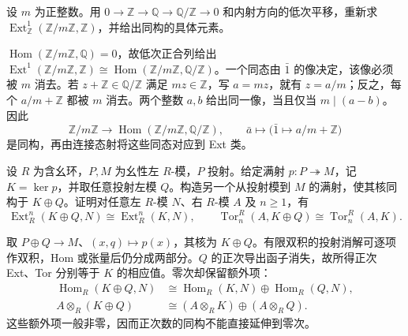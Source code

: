 \begin{exercise}\label{b4:ex:08-injective-shift-integers}
	设 \(m\) 为正整数。用 \(0\to\mathbb Z\to\mathbb Q\to\mathbb Q/\mathbb Z\to0\) 和内射方向的低次平移，重新求 \(\operatorname{Ext}_{\mathbb Z}^1(\mathbb Z/m\mathbb Z,\mathbb Z)\)，并给出同构的具体元素。
\end{exercise}
\begin{solution}
	\(\operatorname{Hom}(\mathbb Z/m\mathbb Z,\mathbb Q)=0\)，故低次正合列给出 \(\operatorname{Ext}^1(\mathbb Z/m\mathbb Z,\mathbb Z)\cong\operatorname{Hom}(\mathbb Z/m\mathbb Z,\mathbb Q/\mathbb Z)\)。一个同态由 \(\bar1\) 的像决定，该像必须被 \(m\) 消去。若 \(z+\mathbb Z\in\mathbb Q/\mathbb Z\) 满足 \(mz\in\mathbb Z\)，写 \(a=mz\)，就有 \(z=a/m\)；反之，每个 \(a/m+\mathbb Z\) 都被 \(m\) 消去。两个整数 \(a,b\) 给出同一像，当且仅当 \(m\mid(a-b)\)。因此
	\[
		\mathbb Z/m\mathbb Z\longrightarrow\operatorname{Hom}(\mathbb Z/m\mathbb Z,\mathbb Q/\mathbb Z), \qquad \bar a\longmapsto\bigl(\bar1\mapsto a/m+\mathbb Z\bigr)
	\]
	是同构，再由连接态射将这些同态对应到 Ext 类。
\end{solution}

\begin{exercise}\label{b4:ex:08-syzygy-change}
	设 \(R\) 为含幺环，\(P,M\) 为幺性左 \(R\)-模，\(P\) 投射。给定满射 \(p:P\twoheadrightarrow M\)，记 \(K=\ker p\)，并取任意投射左模 \(Q\)。构造另一个从投射模到 \(M\) 的满射，使其核同构于 \(K\oplus Q\)。证明对任意左 \(R\)-模 \(N\)、右 \(R\)-模 \(A\) 及 \(n\ge1\)，有
	\[
		\operatorname{Ext}_R^n(K\oplus Q,N)\cong\operatorname{Ext}_R^n(K,N),\qquad \operatorname{Tor}_n^R(A,K\oplus Q)\cong\operatorname{Tor}_n^R(A,K).
	\]
\end{exercise}
\begin{solution}
	取 \(P\oplus Q\to M\)、\((x,q)\mapsto p(x)\)，其核为 \(K\oplus Q\)。有限双积的投射消解可逐项作双积，Hom 或张量后仍分成两部分。\(Q\) 的正次导出函子消失，故所得正次 Ext、Tor 分别等于 \(K\) 的相应值。零次却保留额外项：
	\[
		\begin{aligned}
			\operatorname{Hom}_R(K\oplus Q,N) &\cong\operatorname{Hom}_R(K,N)\oplus\operatorname{Hom}_R(Q,N),\\
			A\otimes_R(K\oplus Q) &\cong(A\otimes_RK)\oplus(A\otimes_RQ).
		\end{aligned}
	\]
	这些额外项一般非零，因而正次数的同构不能直接延伸到零次。
\end{solution}

